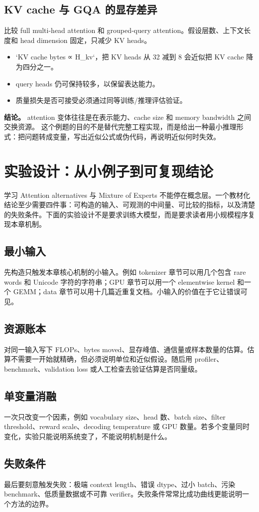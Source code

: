 \documentclass[a4paper]{article}
\begin{document}
\subsection{KV cache 与 GQA 的显存差异}
比较 full multi-head attention 和 grouped-query attention。假设层数、上下文长度和 head dimension 固定，只减少 KV heads。
\begin{itemize}
\item `KV cache bytes ∝ H\_kv`，把 KV heads 从 32 减到 8 会近似把 KV cache 降为四分之一。
\item query heads 仍可保持较多，以保留表达能力。
\item 质量损失是否可接受必须通过同等训练/推理评估验证。
\end{itemize}
\textbf{结论。} attention 变体往往是在表示能力、cache size 和 memory bandwidth 之间交换资源。
这个例题的目的不是替代完整工程实现，而是给出一种最小推理形式：把问题转成变量，写出近似公式或伪代码，再说明近似何时失效。
\section{实验设计：从小例子到可复现结论}
学习 Attention alternatives 与 Mixture of Experts 不能停在概念层。一个教材化结论至少需要四件事：可构造的输入、可观测的中间量、可比较的指标，以及清楚的失败条件。下面的实验设计不是要求训练大模型，而是要求读者用小规模程序复现本章机制。
\subsection{最小输入}
先构造只触发本章核心机制的小输入。例如 tokenizer 章节可以用几个包含 rare words 和 Unicode 字符的字符串；GPU 章节可以用一个 elementwise kernel 和一个 GEMM；data 章节可以用十几篇近重复文档。小输入的价值在于它让错误可见。
\subsection{资源账本}
对同一输入写下 FLOPs、bytes moved、显存峰值、通信量或样本数量的估算。估算不需要一开始就精确，但必须说明单位和近似假设。随后用 profiler、benchmark、validation loss 或人工检查去验证估算是否同量级。
\subsection{单变量消融}
一次只改变一个因素，例如 vocabulary size、head 数、batch size、filter threshold、reward scale、decoding temperature 或 GPU 数量。若多个变量同时变化，实验只能说明系统变了，不能说明机制是什么。
\subsection{失败条件}
最后要刻意触发失败：极端 context length、错误 dtype、过小 batch、污染 benchmark、低质量数据或不可靠 verifier。失败条件常常比成功曲线更能说明一个方法的边界。
\end{document}
